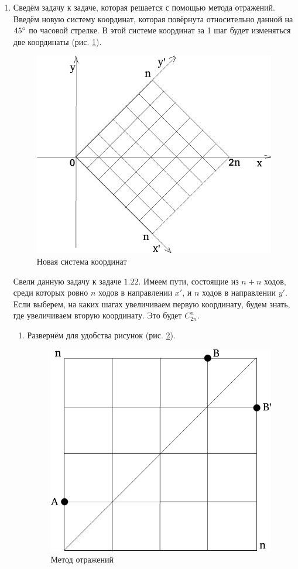 \begin{enumerate}[label=\alph*)]
\item Сведём задачу к задаче, которая решается с помощью метода отражений.
Введём новую систему координат, которая повёрнута относительно данной на $45 \degree $ по часовой стрелке.
В этой системе координат за 1 шаг будет изменяться две координаты (рис. \ref{fig:422}).

\begin{figure}[h!]
  \centering
  \includegraphics[width=.7\textwidth]{./pictures/4_22.png}
  \caption{Новая система координат}
  \label{fig:422}
\end{figure}

Свели данную задачу к задаче $1.22$.
Имеем пути, состоящие из $n + n$ ходов, среди которых ровно $n$ ходов в направлении $x'$, и $n$ ходов в направлении $y'$.
Если выберем, на каких шагах увеличиваем первую координату, будем знать, где увеличиваем вторую координату.
Это будет $C_{2n}^n$.

\begin{enumerate}[label=(\roman*)]
\item Развернём для удобства рисунок (рис. \ref{fig:4221}).

\begin{figure}[h!]
  \centering
  \includegraphics[width=.6\textwidth]{./pictures/4_22_1.png}
  \caption{Метод отражений}
  \label{fig:4221}
\end{figure}


\end{enumerate}
\end{enumerate}
